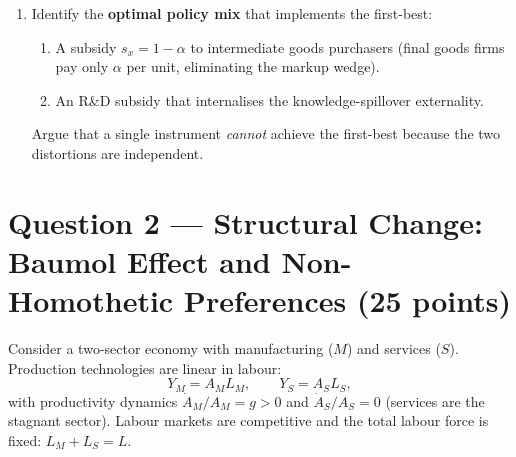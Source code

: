 \documentclass[a4paper,11pt]{article}
\begin{document}
\begin{enumerate}[label=\textbf{\arabic*.}, leftmargin=*, itemsep=6pt]
\begin{enumerate}[label=(\alph*), itemsep=4pt]
        \item Identify the \textbf{optimal policy mix} that implements the first-best:
        \begin{enumerate}[label=(\roman*), itemsep=2pt]
            \item A subsidy $s_x = 1-\alpha$ to intermediate goods purchasers (final goods
            firms pay only $\alpha$ per unit, eliminating the markup wedge).
            \item An R\&D subsidy that internalises the knowledge-spillover externality.
        \end{enumerate}
        Argue that a single instrument \emph{cannot} achieve the first-best because the
        two distortions are independent.
    \end{enumerate}

\end{enumerate}

\clearpage

\section{Question 2 --- Structural Change: Baumol Effect and Non-Homothetic Preferences \hfill (25 points)}

Consider a two-sector economy with manufacturing ($M$) and services ($S$).  Production
technologies are linear in labour:
\[
    Y_M = A_M L_M, \qquad Y_S = A_S L_S,
\]
with productivity dynamics $\dot{A}_M/A_M = g > 0$ and $\dot{A}_S/A_S = 0$ (services are
the stagnant sector).  Labour markets are competitive and the total labour force is fixed:
$L_M + L_S = L$.
\end{document}
